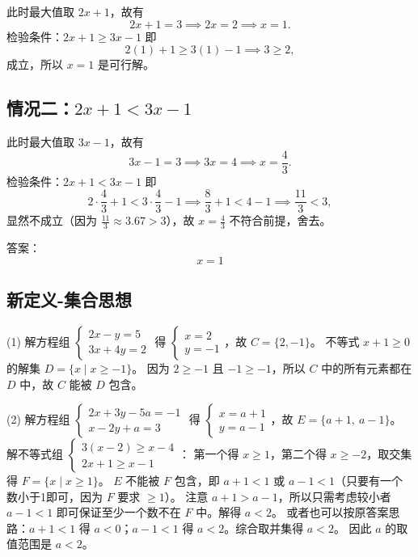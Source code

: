 此时最大值取 \(2x+1\)，故有
\[
2x+1 = 3 \implies 2x = 2 \implies x = 1.
\]
检验条件：\(2x+1 \geq 3x-1\) 即
\[
2(1)+1 \geq 3(1)-1 \implies 3 \geq 2,
\]
成立，所以 \(x=1\) 是可行解。

\subsection*{情况二：\(2x+1 < 3x-1\)}

此时最大值取 \(3x-1\)，故有
\[
3x-1 = 3 \implies 3x = 4 \implies x = \frac{4}{3}.
\]
检验条件：\(2x+1 < 3x-1\) 即
\[
2\cdot\frac{4}{3}+1 < 3\cdot\frac{4}{3}-1 \implies \frac{8}{3}+1 < 4-1 \implies \frac{11}{3} < 3,
\]
显然不成立（因为 \(\frac{11}{3} \approx 3.67 > 3\)），故 \(x=\frac{4}{3}\) 不符合前提，舍去。

答案：\[
\boxed{x = 1}
\]



\subsection{新定义-集合思想}

\label{新定义-集合思想}  %

(1) 解方程组 $\begin{cases} 2x - y = 5 \\ 3x + 4y = 2 \end{cases}$ 得 $\begin{cases} x = 2 \\ y = -1 \end{cases}$，故 $C = \{2, -1\}$。  
不等式 $x + 1 \geq 0$ 的解集 $D = \{x \mid x \geq -1\}$。  
因为 $2 \geq -1$ 且 $-1 \geq -1$，所以 $C$ 中的所有元素都在 $D$ 中，故 $C$ 能被 $D$ 包含。

(2) 解方程组 $\begin{cases} 2x + 3y - 5a = -1 \\ x - 2y + a = 3 \end{cases}$ 得 $\begin{cases} x = a + 1 \\ y = a - 1 \end{cases}$，故 $E = \{a+1,\ a-1\}$。  
解不等式组 $\begin{cases} 3(x-2) \geq x-4 \\ 2x+1 \geq x-1 \end{cases}$：  
第一个得 $x \geq 1$，第二个得 $x \geq -2$，取交集得 $F = \{x \mid x \geq 1\}$。  
$E$ 不能被 $F$ 包含，即 $a+1 < 1$ 或 $a-1 < 1$（只要有一个数小于1即可，因为 $F$ 要求 $\geq 1$）。  
注意 $a+1 > a-1$，所以只需考虑较小者 $a-1 < 1$ 即可保证至少一个数不在 $F$ 中。解得 $a < 2$。  
或者也可以按原答案思路：$a+1 < 1$ 得 $a < 0$；$a-1 < 1$ 得 $a < 2$。综合取并集得 $a < 2$。  
因此 $a$ 的取值范围是 $a < 2$。

